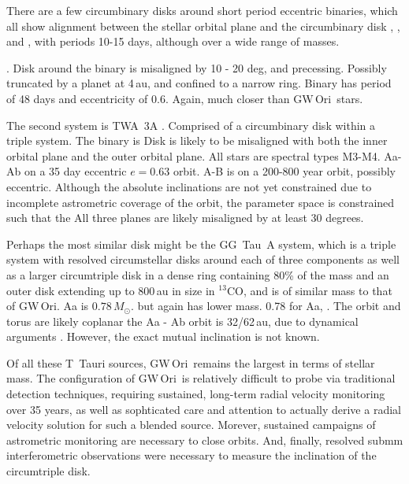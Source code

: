 \documentclass[twocolumn]{aastex61}
\newcommand{\obj}{GW\,Ori}
\newcommand{\thirteen}{${}^{13}$CO}
\begin{document}
There are a few circumbinary disks around short period eccentric binaries, which all show alignment between the stellar orbital plane and the circumbinary disk \citet[V4046~Sgr][]{rosenfeld12b}, \citet[AK~Sco][]{czekala15b}, and \citet[DQ~Tau][]{czekala16}, with periods 10-15 days, although over a wide range of masses.

\citep{chiang04,capelo12}. Disk around the binary is misaligned by 10 - 20 deg, and precessing. Possibly truncated by a planet at 4\,au, and confined to a narrow ring. Binary has period of 48 days and eccentricity of 0.6. Again, much closer than \obj\ stars.

The second system is TWA~3A \citep{kellog17}. Comprised of a circumbinary disk within a triple system. The binary is  Disk is likely to be misaligned with both the inner orbital plane and the outer orbital plane.  All stars are spectral types M3-M4. Aa-Ab on a 35 day eccentric $e=0.63$ orbit. A-B is on a 200-800 year orbit, possibly eccentric. Although the absolute inclinations are not yet constrained due to incomplete astrometric coverage of the orbit, the parameter space is constrained such that the All three planes are likely misaligned by at least 30 degrees.

Perhaps the most similar disk might be the GG~Tau~A system, which is a triple system with resolved circumstellar disks around each of three components as well as a larger circumtriple disk in a dense ring containing 80\% of the mass and an outer disk extending up to 800\,au in size in \thirteen, and is of similar mass to that of \obj \citep[$0.12\,M_\odot$;][]{guilloteau99}. Aa is $0.78\,M_\odot$.  but again has lower mass. 0.78 for Aa,  \citep{dutrey16}. The orbit and torus are likely coplanar the Aa - Ab orbit is 32/62\,au, due to dynamical arguments \citep{nelson16}. However, the exact mutual inclination is not known.

Of all these T~Tauri sources, \obj\ remains the largest in terms of stellar mass. The configuration of \obj\ is relatively difficult to probe via traditional detection techniques, requiring sustained, long-term radial velocity monitoring over 35 years, as well as sophticated care and attention to actually derive a radial velocity solution for such a blended source. Morever, sustained campaigns of astrometric monitoring are necessary to close orbits. And, finally, resolved submm interferometric observations were necessary to measure the inclination of the circumtriple disk.
\end{document}
